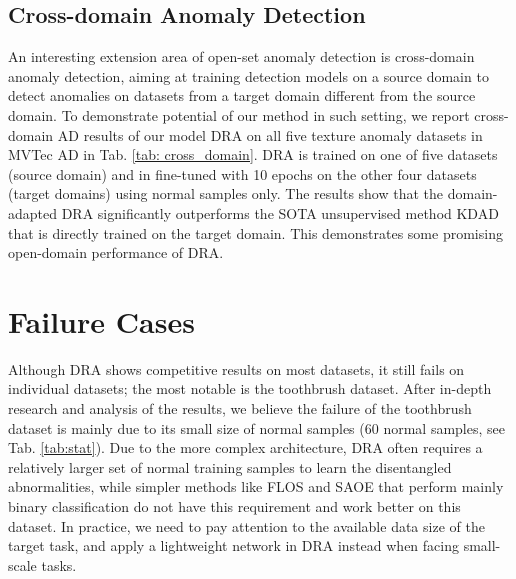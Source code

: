 \documentclass[10pt,twocolumn,letterpaper]{article}
\begin{document}
\subsection{Cross-domain Anomaly Detection}
An interesting extension area of open-set anomaly detection is cross-domain anomaly detection, aiming at training detection models on a source domain to detect anomalies on datasets from a target domain different from the source domain. To demonstrate potential of our method in such setting, we report cross-domain AD results of our model DRA on all five texture anomaly datasets in MVTec AD in Tab. \ref{tab: cross_domain}. DRA is trained on one of five datasets (source domain) and in fine-tuned with 10 epochs on the other four datasets (target domains) using normal samples only. The results show that the domain-adapted DRA significantly outperforms the SOTA unsupervised method KDAD that is directly trained on the target domain. This demonstrates some promising open-domain performance of DRA.
\begin{table}[ht]
\caption{AUC results of domain-adapted DRA and unsupervised method KDAD in texture datasets. The top row is the source domain and the left column is the target domain.}
\centering
\label{tab: cross_domain}
\label{tab:cross_domain}\end{table}

\section{Failure Cases}
Although DRA shows competitive results on most datasets, it still fails on individual datasets; the most notable is the toothbrush dataset. After in-depth research and analysis of the results, we believe the failure of the toothbrush dataset is mainly due to its small size of normal samples (60 normal samples, see Tab. \ref{tab:stat}). Due to the more complex architecture, DRA often requires a relatively larger set of normal training samples to learn the disentangled abnormalities, while simpler methods like FLOS and SAOE that perform mainly binary classification do not have this requirement and work better on this dataset. In practice, we need to pay attention to the available data size of the target task, and apply a lightweight network in DRA instead when facing small-scale tasks.
\end{document}
